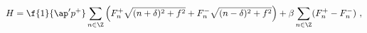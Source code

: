 \begin{equation}
\label{fermham}
H = \f{1}{\ap'p^+} \sum_{n \in \Z} \left(
F^+_n \sqrt{(n+\delta)^2 + f^2 } 
+ F^-_n \sqrt{(n-\delta)^2 + f^2 } \right)
+ \beta \sum_{n \in \Z} ( F^+_n - F^-_n ) \ ,
\end{equation}

